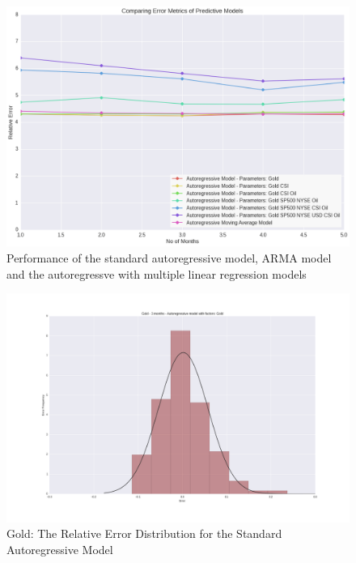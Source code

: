 \documentclass[runningheads]{llncs}
\begin{document}
\begin{figure}
\centering
\includegraphics[width=\textwidth]{ModelComparison_Gold.png}
\caption{Performance of the standard autoregressive model, ARMA model and the autoregressve with multiple linear regression models}
\label{fig:ModelComparison_Gold.png}
\end{figure}

\begin{figure}
\centering
\includegraphics[width=\textwidth]{Gold_Auto.png}
\caption{Gold: The Relative Error Distribution for the Standard Autoregressive Model}
\label{fig:Gold_Auto.png}
\end{figure}
\end{document}

